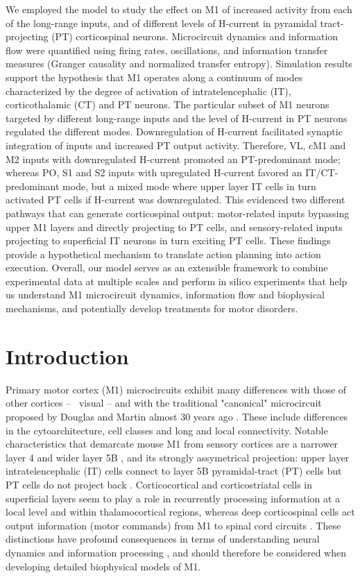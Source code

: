 We employed the model to study the effect on M1 of increased activity from each of the long-range inputs, and of different levels of H-current in pyramidal tract-projecting (PT) corticospinal neurons. Microcircuit dynamics and information flow were quantified using firing rates, oscillations, and information transfer measures (Granger causality and normalized transfer entropy). Simulation results support the hypothesis that M1 operates along a continuum of modes characterized by the degree of activation of intratelencephalic (IT), corticothalamic (CT) and PT neurons. The particular subset of M1 neurons targeted by different long-range inputs and the level of H-current in PT neurons regulated the different modes. Downregulation of H-current facilitated synaptic integration of inputs and increased PT output activity. Therefore, VL, cM1 and M2 inputs with downregulated H-current promoted an PT-predominant mode; whereas PO, S1 and S2 inputs with upregulated H-current favored an IT/CT-predominant mode, but a mixed mode where upper layer IT cells in turn activated PT cells if H-current was downregulated. This evidenced two different pathways that can generate corticospinal output: motor-related inputs bypassing upper M1 layers and directly projecting to PT cells, and sensory-related inputs projecting to superficial IT neurons in turn exciting PT cells. These findings provide a hypothetical mechanism to translate action planning into action execution. Overall, our model serves as an extensible framework to combine experimental data at multiple scales and perform in silico experiments that help us understand M1 microcircuit dynamics, information flow and biophysical mechanisms, and potentially develop treatments for motor disorders.

\section{Introduction} 
Primary motor cortex (M1) microcircuits exhibit many differences with those of other cortices -- \eg\ visual \cite{Ship05} -- and with the traditional "canonical" microcircuit proposed by Douglas and Martin almost 30 years ago \cite{douglas89}. These include differences in the cytoarchitecture, cell classes and long and local connectivity. Notable characteristics that demarcate mouse M1 from sensory cortices are a narrower layer 4 and wider layer 5B \cite{Yama15}, and its strongly assymetrical projection: upper layer intratelencephalic (IT) cells connect to layer 5B pyramidal-tract (PT) cells but PT cells do not project back \cite{Weil08,Ande10}. Corticocortical and corticostriatal cells in superficial layers seem to play a role in recurrently processing information at a local level and within thalamocortical regions, whereas deep corticospinal cells act output information (motor commands) from M1 to spinal cord circuits \cite{Weil08,Ande10}. These distinctions have profound consequences in terms of understanding neural dynamics and information processing \cite{Shep13}, and should therefore be considered when developing detailed biophysical models of M1.

